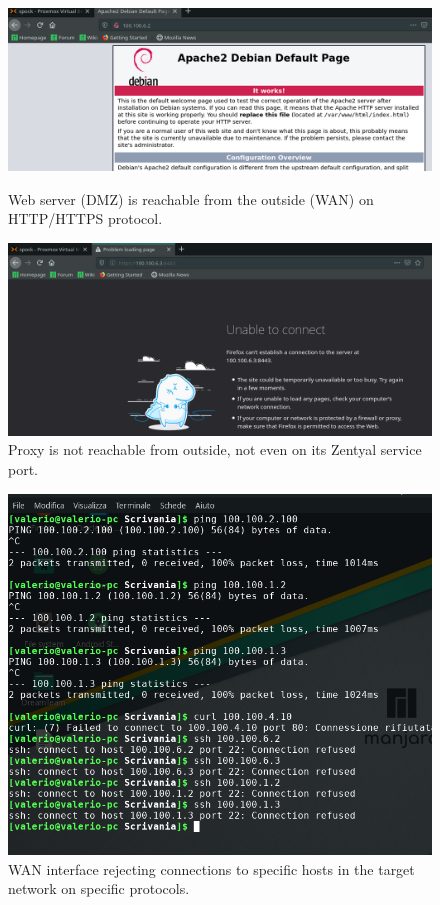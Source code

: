\begin{figure}[H]
\centering
\begin{minipage}{.5\textwidth}
  \centering
  \includegraphics[width=1\textwidth]{web_reachableHTTP.png}
  \caption[a]{Web server (DMZ) is reachable from the outside (WAN) on HTTP/HTTPS protocol.}\label{fig:7}
\end{minipage}%
\begin{minipage}{.5\textwidth}
  \centering
  \includegraphics[width=1\textwidth]{firewallShieldingProxyZentyal.png}
  \caption[a]{Proxy is not reachable from outside, not even on its Zentyal service port.}\label{fig:8}
\end{minipage}
\end{figure}

\begin{figure}[H]
\centering
  \includegraphics[width=1\textwidth]{WANRefusingUndesiredConnections.png}
  \caption[a]{WAN interface rejecting connections to specific hosts in the target network on specific protocols.}\label{fig:9}
\end{figure}

